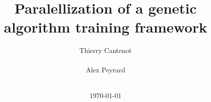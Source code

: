 \documentclass{acm_proc_article-sp}
\begin{document}
\title{Paralellization of a genetic algorithm training framework}
%
%
%
%
%

%
\author{
%
%
\alignauthor
Thierry Cantenot\\
       \\
\alignauthor
Alex Peyrard\\
       \\
}
\date{\today}
\end{document}
